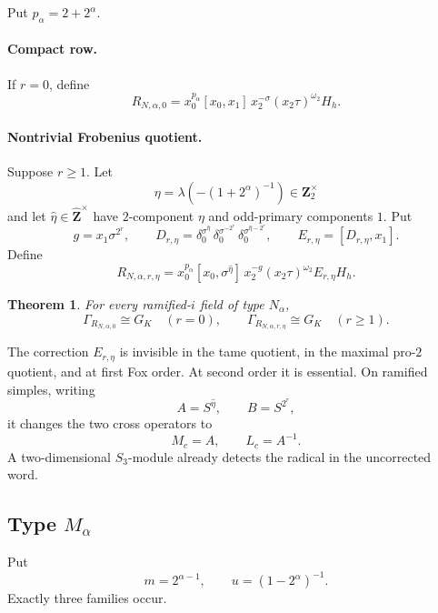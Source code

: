 \documentclass[11pt,reqno]{amsart}
\newtheorem{theorem}{Theorem}[section]
\theoremstyle{definition}
\theoremstyle{remark}
\numberwithin{equation}{section}
\newcommand{\Z}{\mathbf Z}
\newcommand{\whZ}{\widehat{\Z}}
\begin{document}
Put \(p_\alpha=2+2^\alpha\).

\paragraph{Compact row.}
If \(r=0\), define
\begin{equation}\label{eq:Ncompact-word}
 R_{N,\alpha,0}
 =x_0^{p_\alpha}[x_0,x_1]\,
  x_2^{-\sigma}(x_2\tau)^{\omega_2}H_h.
\end{equation}

\paragraph{Nontrivial Frobenius quotient.}
Suppose \(r\ge1\).  Let
\[
 \eta=\lambda\!\left(-(1+2^\alpha)^{-1}\right)\in\Z_2^\times
\]
and let \(\widehat\eta\in\whZ^\times\) have \(2\)-component \(\eta\)
and odd-primary components \(1\).  Put
\[
 g=x_1\sigma^{2^r},\qquad
 D_{r,\eta}
 =\delta_0^{\sigma^{\widehat\eta}}\,
  \delta_0^{\sigma^{-2^r}}\,
  \delta_0^{\sigma^{\widehat\eta-2^r}},
\qquad
 E_{r,\eta}=[D_{r,\eta},x_1].
\]
Define
\begin{equation}\label{eq:Npc-word}
 R_{N,\alpha,r,\eta}
 =x_0^{p_\alpha}[x_0,\sigma^{\widehat\eta}]\,
 x_2^{-g}(x_2\tau)^{\omega_2}E_{r,\eta}H_h.
\end{equation}

\begin{theorem}\label{thm:Nwords}
For every ramified-\(i\) field of type \(N_\alpha\),
\[
 \Gamma_{R_{N,\alpha,0}}\cong G_K\quad(r=0),
\qquad
 \Gamma_{R_{N,\alpha,r,\eta}}\cong G_K\quad(r\ge1).
\]
\end{theorem}

The correction \(E_{r,\eta}\) is invisible in the tame quotient, in the
maximal pro-\(2\) quotient, and at first Fox order.  At second order it is
essential.  On ramified simples, writing
\[
 A=S^{\widehat\eta},\qquad B=S^{2^r},
\]
it changes the two cross operators to
\begin{equation}\label{eq:Ncross}
 M_c=A,\qquad L_c=A^{-1}.
\end{equation}
A two-dimensional \(S_3\)-module already detects the radical in the
uncorrected word.

\subsection{Type \texorpdfstring{\(M_\alpha\)}{M-alpha}}

Put
\[
 m=2^{\alpha-1},\qquad u=(1-2^\alpha)^{-1}.
\]
Exactly three families occur.
\end{document}

